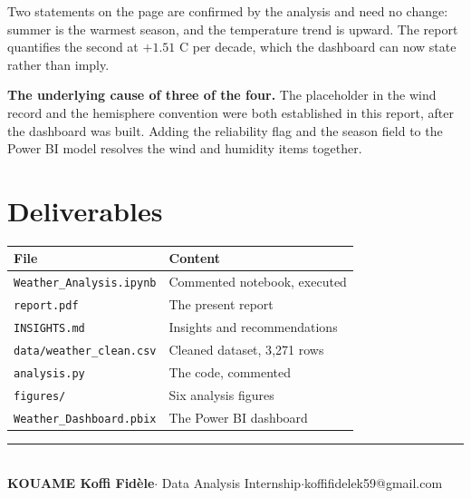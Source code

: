 \documentclass[12pt,a4paper]{article}
\newcommand{\thinrule}{\textcolor{rulegrey}{\rule{\linewidth}{0.4pt}}}
\begin{document}
Two statements on the page are confirmed by the analysis and need no change: summer is
the warmest season, and the temperature trend is upward. The report quantifies the
second at $+1.51$ \textdegree C per decade, which the dashboard can now state rather
than imply.

\textbf{The underlying cause of three of the four.} The placeholder in the wind record
and the hemisphere convention were both established in this report, after the
dashboard was built. Adding the reliability flag and the season field to the Power BI
model resolves the wind and humidity items together.

\section*{Deliverables}

\begin{table}[H]\centering
\small
\begin{tabular}{@{}ll@{}}
\toprule
\textbf{File} & \textbf{Content} \\
\midrule
\texttt{Weather\_Analysis.ipynb} & Commented notebook, executed \\
\texttt{report.pdf} & The present report \\
\texttt{INSIGHTS.md} & Insights and recommendations \\
\texttt{data/weather\_clean.csv} & Cleaned dataset, 3{,}271 rows \\
\texttt{analysis.py} & The code, commented \\
\texttt{figures/} & Six analysis figures \\
\texttt{Weather\_Dashboard.pbix} & The Power BI dashboard \\
\bottomrule
\end{tabular}
\end{table}

\vfill
\noindent\thinrule\\[4pt]
{\small\textbf{KOUAME Koffi Fidèle}\quad\textcolor{soft}{$\cdot$}\quad
\color{soft}Data Analysis Internship\quad$\cdot$\quad koffifidelek59@gmail.com}
\end{document}
